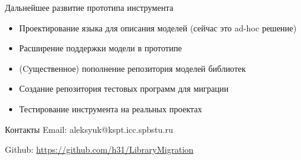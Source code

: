 \documentclass[12pt]{beamer}
\begin{document}
{
\begin{frame}{Дальнейшее развитие прототипа инструмента}
	\begin{mybox}[]
	\begin{itemize}
		\item Проектирование языка для описания моделей (сейчас это ad-hoc решение)
		\item Расширение поддержки модели в прототипе
		\item (Cущественное) пополнение репозитория моделей библиотек
		\item Создание репозитория тестовых программ для миграции
		\item Тестирование инструмента на реальных проектах
	\end{itemize}
	\end{mybox}
\end{frame}
}

\begin{frame}{Контакты}
	Email: aleksyuk@kspt.icc.spbstu.ru
	
	Github: \url{https://github.com/h31/LibraryMigration}
\end{frame}
\end{document}
